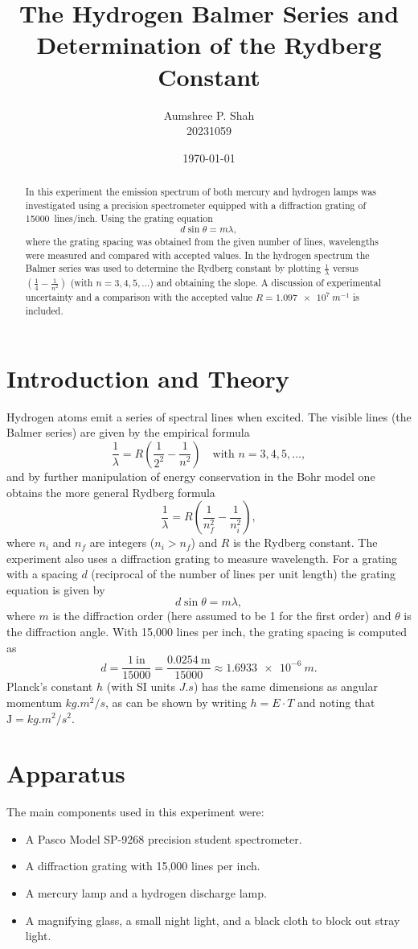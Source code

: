\documentclass[12pt]{article}
\title{The Hydrogen Balmer Series and Determination of the Rydberg Constant}
\author{Aumshree P. Shah\\20231059}
\date{\today}
\begin{document}
\maketitle

\begin{abstract}
  In this experiment the emission spectrum of both mercury and hydrogen lamps was investigated using a precision spectrometer equipped with a diffraction grating of \SI{15000}{lines/inch}. Using the grating equation 
  \[
  d\sin\theta = m\lambda,
  \]
  where the grating spacing was obtained from the given number of lines, wavelengths were measured and compared with accepted values. In the hydrogen spectrum the Balmer series was used to determine the Rydberg constant by plotting \(\frac{1}{\lambda}\) versus \(\left(\frac{1}{4} - \frac{1}{n^2}\right)\) (with \(n=3,4,5,\ldots\)) and obtaining the slope. A discussion of experimental uncertainty and a comparison with the accepted value \(R = \SI{1.097e7}{m^{-1}}\) is included.
\end{abstract}

\section{Introduction and Theory}
Hydrogen atoms emit a series of spectral lines when excited. The visible lines (the Balmer series) are given by the empirical formula
\[
\frac{1}{\lambda} = R \left(\frac{1}{2^2} - \frac{1}{n^2}\right) \quad \text{with } n=3,4,5,\ldots,
\]
and by further manipulation of energy conservation in the Bohr model one obtains the more general Rydberg formula
\[
\frac{1}{\lambda} = R\left(\frac{1}{n_f^2} - \frac{1}{n_i^2}\right),
\]
where \(n_i\) and \(n_f\) are integers (\(n_i>n_f\)) and \(R\) is the Rydberg constant. The experiment also uses a diffraction grating to measure wavelength. For a grating with a spacing \(d\) (reciprocal of the number of lines per unit length) the grating equation is given by
\[
d\sin\theta = m\lambda,
\]
where \(m\) is the diffraction order (here assumed to be 1 for the first order) and \(\theta\) is the diffraction angle. With 15,000 lines per inch, the grating spacing is computed as
\[
d = \frac{1~\text{in}}{15000} = \frac{0.0254~\text{m}}{15000} \approx \SI{1.6933e-6}{m}.
\]
Planck's constant \(h\) (with SI units \(\si{J.s}\)) has the same dimensions as angular momentum \(\si{kg.m^2/s}\), as can be shown by writing \(h = E\cdot T\) and noting that \(\text{J}=\si{kg.m^2/s^2}\).

\section{Apparatus}
The main components used in this experiment were:
\begin{itemize}
  \item A Pasco Model SP-9268 precision student spectrometer.
  \item A diffraction grating with 15,000 lines per inch.
  \item A mercury lamp and a hydrogen discharge lamp.
  \item A magnifying glass, a small night light, and a black cloth to block out stray light.
\end{itemize}
\end{document}
